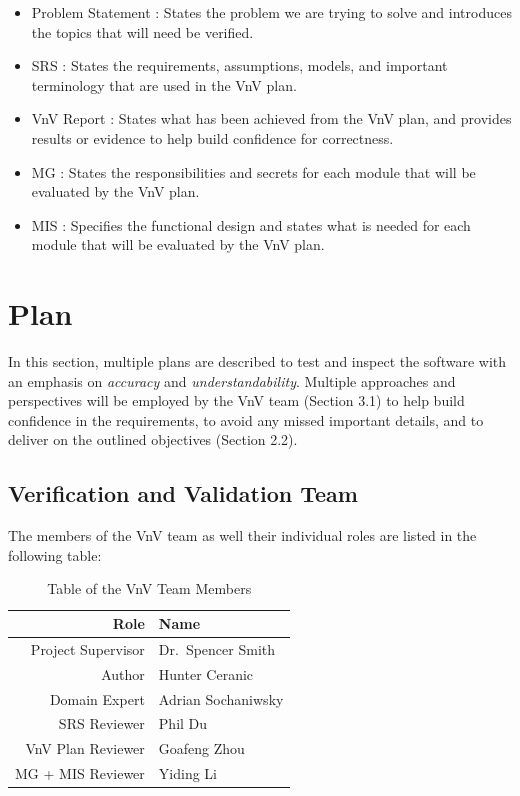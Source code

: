 \documentclass[12pt, titlepage]{article}
\begin{document}
\begin{itemize}
  \item Problem Statement \citep{Prob_Statement}: States the problem we are trying to solve
    and introduces the topics that will need be verified.
  \item SRS \citep{SRS}: States the requirements, assumptions, models, and important 
  terminology that are used in the VnV plan.
  \item VnV Report \citep{VnV_report}: States what has been achieved from the VnV plan,
    and provides results or evidence to help build confidence for correctness.
  \item MG \citep{MG}: States the responsibilities and secrets for each module that will
    be evaluated by the VnV plan.
  \item MIS \citep{MIS}: Specifies the functional design and states what is needed for each
    module that will be evaluated by the VnV plan.
\end{itemize}

\section{Plan}

In this section, multiple plans are described to test and inspect the software with an emphasis 
on \textit{accuracy} and \textit{understandability}. Multiple approaches and perspectives will be employed by the VnV team (Section 3.1)
to help build confidence in the requirements, to avoid any missed important details, 
and to deliver on the outlined objectives (Section 2.2).

\subsection{Verification and Validation Team}

The members of the VnV team as well their individual roles are listed in the following table:

\begin{table}[h!]
  \centering
  \begin{tabular}{|r|l|}
    \hline
    \textbf{Role} & \textbf{Name} \\ \hline
    Project Supervisor & Dr.\ Spencer Smith  \\ \hline
    Author             & Hunter Ceranic      \\ \hline
    Domain Expert      & Adrian Sochaniwsky  \\ \hline
    SRS Reviewer       & Phil Du             \\ \hline
    VnV Plan Reviewer  & Goafeng Zhou        \\ \hline
    MG + MIS Reviewer  & Yiding Li           \\ \hline
  \end{tabular}
  \caption{Table of the VnV Team Members}
  \label{table_vnv_team}
\end{table}
\end{document}
